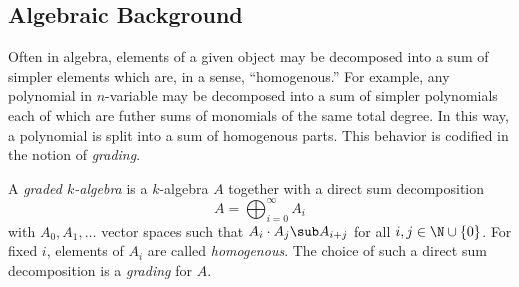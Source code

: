\documentclass[12pt]{article}
\begin{document}
\subsection{Algebraic Background}

%
%

Often in algebra, elements of a given object may be decomposed into a sum of simpler elements which are, in a sense, ``homogenous.'' For example, any polynomial in $ n $-variable may be decomposed into a sum of simpler polynomials each of which are futher sums of monomials of the same total degree.  In this way, a polynomial is split into a sum of homogenous parts. This behavior is codified in the notion of \textit{grading}.

\begin{definition}\label{def:gralg}
A \textit{graded $ k $-algebra} is a $ k $-algebra $ A $ together with a direct sum decomposition
\[
  A = \bigoplus_{i=0}^{\infty} A_{i}
\]
with $ A_{0},A_{1},\ldots $ vector spaces such that $ A_{i}\cdot A_{j}\sub A_{i+j} $ for all $ i,j\in \N\cup\{0\} $. For fixed $ i $, elements of $ A_{i} $ are called \textit{homogenous}. The choice of such a direct sum decomposition is a \textit{grading} for $ A $.
\end{definition}
\end{document}
